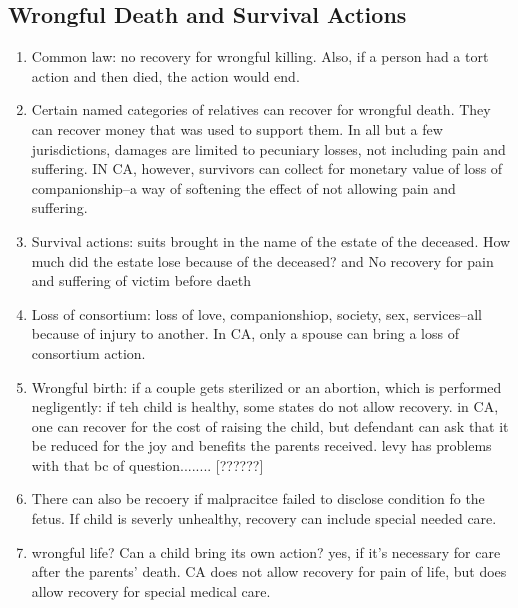 \subsection{Wrongful Death and Survival Actions}

%
%
\begin{enumerate}
    \item Common law: no recovery for wrongful killing. Also, if a person had 
    a tort action and then died, the action would end.
    \item Certain named categories of relatives can recover for wrongful 
    death. They can recover money that was used to support them. In all but a 
    few jurisdictions, damages are limited to pecuniary losses, not including 
    pain and suffering. IN CA, however, survivors can collect for monetary 
    value of loss of companionship--a way of softening the effect of not 
    allowing pain and suffering.
    \item Survival actions: suits brought in the name of the estate of the 
    deceased. How much did the estate lose because of the deceased? and No 
    recovery for pain and suffering of victim before daeth
    \item Loss of consortium: loss of love, companionshiop, society, sex, 
    services--all because of injury to another. In CA, only a spouse can bring 
    a loss of consortium action.
    \item Wrongful birth: if a couple gets sterilized or an abortion, which is 
    performed negligently: if teh child is healthy, some states do not allow 
    recovery. in CA, one can recover for the cost of raising the child, but 
    defendant can ask that it be reduced for the joy and benefits the parents 
    received. levy has problems with that bc of question........ [??????]
    \item There can also be recoery if malpracitce failed to disclose 
    condition fo the fetus. If child is severly unhealthy, recovery can 
    include special needed care.
    \item wrongful life? Can a child bring its own action? yes, if it's 
    necessary for care after the parents' death. CA does not allow recovery 
    for pain of life, but does allow recovery for special medical care.
\end{enumerate}
%
%
%
%
%
